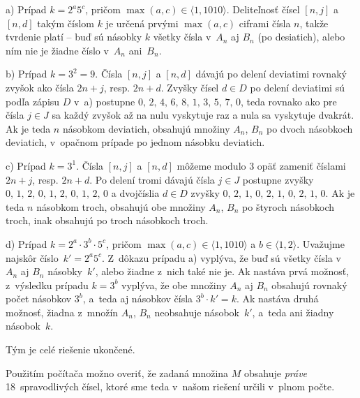 {\item{a)}
Prípad $k=2^a5^c$, pričom $\max(a,c)\in\langle1,1010\rangle$.
Deliteľnosť čísel $[n,j]$ a $[n,d]$ takým číslom $k$ je
určená prvými $\max(a,c)$ ciframi čísla $n$, takže tvrdenie platí --
buď sú násobky $k$ všetky čísla v~$A_n$ aj $B_n$ (po desiatich),
alebo ním nie je žiadne číslo v~$A_n$ ani~$B_n$.

\item{b)}
Prípad $k=3^2=9$.
Čísla $[n,j]$ a $[n,d]$ dávajú po delení deviatimi rovnaký zvyšok
ako čísla $2n+j$, resp. $2n+d$. Zvyšky čísel $d\in D$ po delení deviatimi
sú podľa zápisu $D$ v~a) postupne
$0,\,2,\,4,\,6,\,8,\,1,\,3,\,5,\,7,\,0$, teda rovnako ako pre čísla
$j\in J$ sa každý zvyšok až na nulu vyskytuje raz a nula sa
vyskytuje dvakrát. Ak je teda $n$ násobkom deviatich, obsahujú
množiny $A_n$, $B_n$ po dvoch násobkoch deviatich, v~opačnom prípade
po jednom násobku deviatich.

\item{c)}
Prípad $k=3^1$.
Čísla $[n,j]$ a $[n,d]$ môžeme modulo 3 opäť zameniť číslami $2n+j$,
resp. $2n+d$. Po delení tromi dávajú čísla $j\in J$ postupne zvyšky
$0,\,1,\,2,\,0,\,1,\,2,\,0,\,1,\,2,\,0$ a
dvojčíslia $d\in D$ zvyšky $0,\,2,\,1,\,0,\,2,\,1,\,0,\,2,\,1,\,0$.
Ak je teda $n$ násobkom troch, obsahujú obe množiny $A_n$, $B_n$
po štyroch násobkoch troch, inak obsahujú po troch násobkoch troch.

\item{d)}
Prípad $k=2^a\cdot3^b\cdot 5^c$, pričom $\max(a,c)\in\langle1,1010\rangle$
a $b\in\langle1,2\rangle$. Uvažujme najskôr číslo~$k'=2^a5^c$.
Z~dôkazu prípadu a) vyplýva, že buď sú všetky čísla
v~$A_n$ aj $B_n$ násobky~$k'$, alebo žiadne z~nich také nie je.
Ak nastáva prvá možnosť, z~výsledku prípadu $k=3^b$ vyplýva,
že obe množiny $A_n$ aj $B_n$ obsahujú rovnaký počet násobkov $3^b$,
a~teda aj násobkov čísla $3^b\cdot k'=k$. Ak nastáva druhá možnosť,
žiadna z~množín $A_n$, $B_n$ neobsahuje násobok~$k'$,
a~teda ani žiadny násobok~$k$.

\smallskip
Tým je celé riešenie ukončené.

\poznamka
Použitím počítača možno overiť, že zadaná množina $M$
obsahuje \emph{práve} 18~spravodlivých čísel, ktoré sme teda
v~našom riešení určili v~plnom počte.
}

